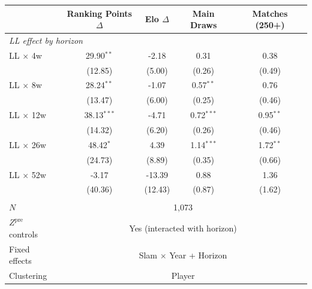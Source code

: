 \begin{tabular}{lcccc}
\toprule
 & Ranking Points $\Delta$ & Elo $\Delta$ & Main Draws & Matches (250+) \\
\midrule
\multicolumn{5}{l}{\textit{LL effect by horizon}} \\
\quad LL $\times$ 4w & 29.90$^{**}$ & -2.18 & 0.31 & 0.38 \\
 & (12.85) & (5.00) & (0.26) & (0.49) \\
\quad LL $\times$ 8w & 28.24$^{**}$ & -1.07 & 0.57$^{**}$ & 0.76 \\
 & (13.47) & (6.00) & (0.25) & (0.46) \\
\quad LL $\times$ 12w & 38.13$^{***}$ & -4.71 & 0.72$^{***}$ & 0.95$^{**}$ \\
 & (14.32) & (6.20) & (0.26) & (0.46) \\
\quad LL $\times$ 26w & 48.42$^{*}$ & 4.39 & 1.14$^{***}$ & 1.72$^{**}$ \\
 & (24.73) & (8.89) & (0.35) & (0.66) \\
\quad LL $\times$ 52w & -3.17 & -13.39 & 0.88 & 1.36 \\
 & (40.36) & (12.43) & (0.87) & (1.62) \\
\\[0.3em]
\midrule
$N$ & \multicolumn{4}{c}{1,073} \\
$Z^{\text{pre}}$ controls & \multicolumn{4}{c}{Yes (interacted with horizon)} \\
Fixed effects & \multicolumn{4}{c}{Slam $\times$ Year + Horizon} \\
Clustering & \multicolumn{4}{c}{Player} \\
\bottomrule
\end{tabular}
